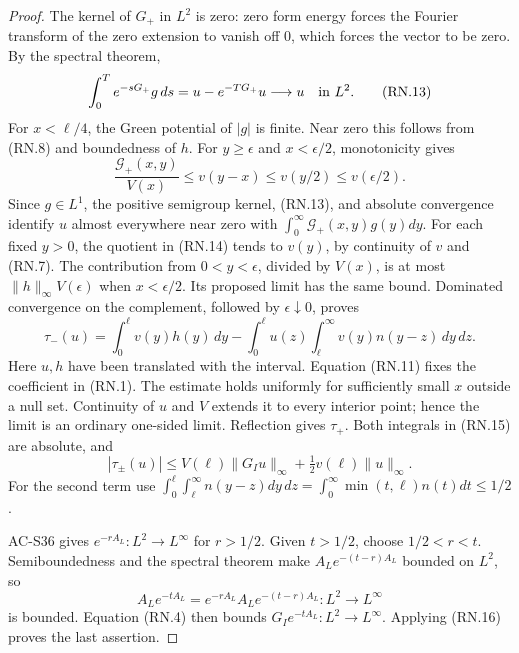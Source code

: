 \begin{proof}
The kernel of \(G_+\) in \(L^2\) is zero: zero form energy forces
the Fourier transform of the zero extension to vanish off \(0\),
which forces the vector to be zero.  By the spectral theorem,
\[
 \int_0^T e^{-sG_+}g\,ds
          =u-e^{-TG_+}u\longrightarrow u\quad\hbox{in }L^2.
                                                        \tag{RN.13}
\]
For \(x<\ell/4\), the Green potential of \(|g|\) is finite.
Near zero this follows from (RN.8) and boundedness of \(h\).
For \(y\geq\epsilon\) and \(x<\epsilon/2\), monotonicity gives
\[
 \frac{\mathcal G_+(x,y)}{V(x)}
              \leq v(y-x)\leq v(y/2)\leq v(\epsilon/2).
                                                        \tag{RN.14}
\]
Since \(g\in L^1\), the positive semigroup kernel, (RN.13),
and absolute convergence identify \(u\) almost everywhere near
zero with \(\int_0^\infty\mathcal G_+(x,y)g(y)dy\).
For each fixed \(y>0\), the quotient in (RN.14) tends to \(v(y)\),
by continuity of \(v\) and (RN.7).
The contribution from \(0<y<\epsilon\), divided by \(V(x)\),
is at most \(\|h\|_\infty V(\epsilon)\) when \(x<\epsilon/2\).
Its proposed limit has the same bound.  Dominated convergence
on the complement, followed by \(\epsilon\downarrow0\), proves
\[
 \tau_-(u)=\int_0^\ell v(y)h(y)\,dy
 -\int_0^\ell u(z)\int_\ell^\infty v(y)n(y-z)\,dy\,dz.
                                                        \tag{RN.15}
\]
Here \(u,h\) have been translated with the interval.
Equation (RN.11) fixes the coefficient in (RN.1).
The estimate holds uniformly for sufficiently small \(x\) outside
a null set.  Continuity of \(u\) and \(V\) extends it to every
interior point; hence the limit is an ordinary one-sided limit.
Reflection gives \(\tau_+\).
Both integrals in (RN.15) are absolute, and
\[
 |\tau_\pm(u)|
    \leq V(\ell)\|G_Iu\|_\infty
                    +\tfrac12v(\ell)\|u\|_\infty.
                                                        \tag{RN.16}
\]
For the second term use
\(\int_0^\ell\int_\ell^\infty n(y-z)dy\,dz
 =\int_0^\infty\min(t,\ell)n(t)dt\leq1/2\).

AC-S36 gives \(e^{-rA_L}:L^2\to L^\infty\) for \(r>1/2\).
Given \(t>1/2\), choose \(1/2<r<t\).
Semiboundedness and the spectral theorem make
\(A_Le^{-(t-r)A_L}\) bounded on \(L^2\), so
\[
 A_Le^{-tA_L}=e^{-rA_L}A_Le^{-(t-r)A_L}:L^2\to L^\infty
\]
is bounded.  Equation (RN.4) then bounds
\(G_Ie^{-tA_L}:L^2\to L^\infty\).
Applying (RN.16) proves the last assertion.
\end{proof}

